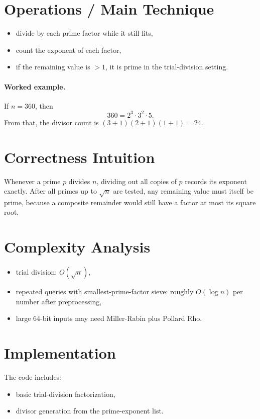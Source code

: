 \section*{Operations / Main Technique}

\begin{itemize}
  \item divide by each prime factor while it still fits,
  \item count the exponent of each factor,
  \item if the remaining value is \(> 1\), it is prime in the trial-division setting.
\end{itemize}

\paragraph{Worked example.}
If \(n = 360\), then
\[
360 = 2^3 \cdot 3^2 \cdot 5.
\]
From that, the divisor count is \((3+1)(2+1)(1+1) = 24\).

\section*{Correctness Intuition}

Whenever a prime \(p\) divides \(n\), dividing out all copies of \(p\) records its exponent exactly. After all primes up
to \(\sqrt{n}\) are tested, any remaining value must itself be prime, because a composite remainder would still have a
factor at most its square root.

\section*{Complexity Analysis}

\begin{itemize}
  \item trial division: \(O(\sqrt{n})\),
  \item repeated queries with smallest-prime-factor sieve: roughly \(O(\log n)\) per number after preprocessing,
  \item large 64-bit inputs may need Miller-Rabin plus Pollard Rho.
\end{itemize}

\section*{Implementation}

The code includes:

\begin{itemize}
  \item basic trial-division factorization,
  \item divisor generation from the prime-exponent list.
\end{itemize}


